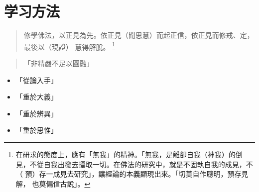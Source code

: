 \section{学习方法}

\begin{quote}
  修學佛法，以正見為先。依正見（聞思慧）而起正信，依正見而修戒、定，最後以（現證） 慧得解脫。
  \footnote{在研求的態度上，應有「無我」的精神。「無我，是離卻自我（神我）的倒 見，不從自我出發去攝取一切。在佛法的研究中，就是不固執自我的成見，不（ 預）存一成見去研究」，讓經論的本義顯現出來。「切莫自作聰明，預存見解， 也莫偏信古說」。}
\end{quote}

\begin{quote}
  「非精嚴不足以圓融」
\end{quote}

\begin{itemize}
  \item 「從論入手」
  \item 「重於大義」
  \item 「重於辨異」
  \item 「重於思惟」
\end{itemize}
